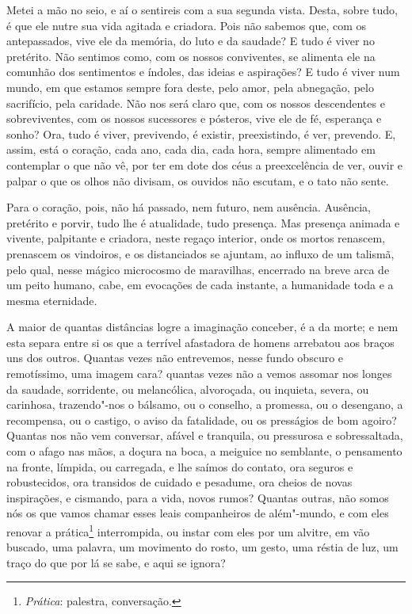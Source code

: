 Metei a mão no seio, e aí o sentireis com a sua segunda vista.
Desta, sobre tudo, é que ele nutre sua vida agitada e criadora. Pois
não sabemos que, com os antepassados, vive ele da memória, do luto e da
saudade? E tudo é viver no pretérito. Não sentimos como, com os nossos
conviventes, se alimenta ele na comunhão dos sentimentos e índoles, das
ideias e aspirações? E tudo é viver num mundo, em que estamos sempre
fora deste, pelo amor, pela abnegação, pelo sacrifício, pela caridade.
Não nos será claro que, com os nossos descendentes e sobreviventes, com
os nossos sucessores e pósteros, vive ele de fé, esperança e sonho?
Ora, tudo é viver, previvendo, é existir, preexistindo, é ver,
prevendo. E, assim, está o coração, cada ano, cada dia, cada hora,
sempre alimentado em contemplar o que não vê, por ter em dote dos céus
a preexcelência de ver, ouvir e palpar o que os olhos não divisam, os
ouvidos não escutam, e o tato não sente.

Para o coração, pois, não há passado, nem futuro, nem ausência.
Ausência, pretérito e porvir, tudo lhe é atualidade, tudo presença. Mas
presença animada e vivente, palpitante e criadora, neste regaço
interior, onde os mortos renascem, prenascem os vindoiros, e os
distanciados se ajuntam, ao influxo de um talismã, pelo qual, nesse
mágico microcosmo de maravilhas, encerrado na breve arca de um peito
humano, cabe, em evocações de cada instante, a humanidade toda e a
mesma eternidade.

A maior de quantas distâncias logre a imaginação conceber, é a da
morte; e nem esta separa entre si os que a terrível afastadora de
homens arrebatou aos braços uns dos outros. Quantas vezes não
entrevemos, nesse fundo obscuro e remotíssimo, uma imagem cara? quantas
vezes não a vemos assomar nos longes da saudade, sorridente, ou
melancólica, alvoroçada, ou inquieta, severa, ou carinhosa,
trazendo"-nos o bálsamo, ou o conselho, a promessa, ou o desengano, a
recompensa, ou o castigo, o aviso da fatalidade, ou os presságios de
bom agoiro? Quantas nos não vem conversar, afável e tranquila, ou
pressurosa e sobressaltada, com o afago nas mãos, a doçura na boca, a
meiguice no semblante, o pensamento na fronte, límpida, ou carregada, e
lhe saímos do contato, ora seguros e robustecidos, ora
transidos de cuidado e
pesadume, ora cheios de novas inspirações, e cismando, para a vida,
novos rumos? Quantas outras, não somos nós os que vamos chamar esses
leais companheiros de além"-mundo, e com eles renovar a
prática\footnote{ \textit{Prática}: palestra, conversação.} interrompida, ou instar com eles por um alvitre, em
vão buscado, uma palavra, um movimento do rosto, um gesto, uma réstia
de luz, um traço do que por lá se sabe, e aqui se ignora?

